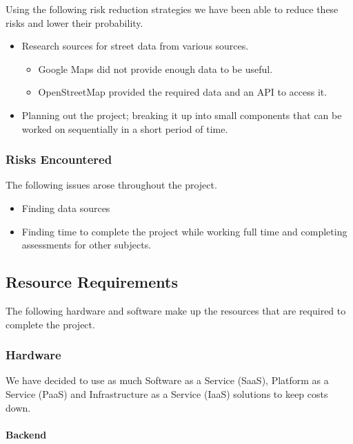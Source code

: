 \documentclass[a4paper,11pt]{article}
\begin{document}
Using the following risk reduction strategies we have been able to reduce these
risks and lower their probability.

\begin{itemize}
  \item Research sources for street data from various sources.
    \begin{itemize}
      \item Google Maps did not provide enough data to be useful.
      \item OpenStreetMap provided the required data and an API to access it.
    \end{itemize}
  \item Planning out the project; breaking it up into small components that can
    be worked on sequentially in a short period of time.
\end{itemize}

\subsubsection{Risks Encountered}

The following issues arose throughout the project.

\begin{itemize}
  \item Finding data sources
  \item Finding time to complete the project while working full time and
    completing assessments for other subjects.
\end{itemize}

\subsection{Resource Requirements}

The following hardware and software make up the resources that are required to
complete the project.

\subsubsection{Hardware}

We have decided to use as much Software as a Service (SaaS), Platform as a
Service (PaaS) and Infrastructure as a Service (IaaS) solutions to keep costs
down. \autocite[4]{project-spec:2}

\paragraph{Backend}
\end{document}
